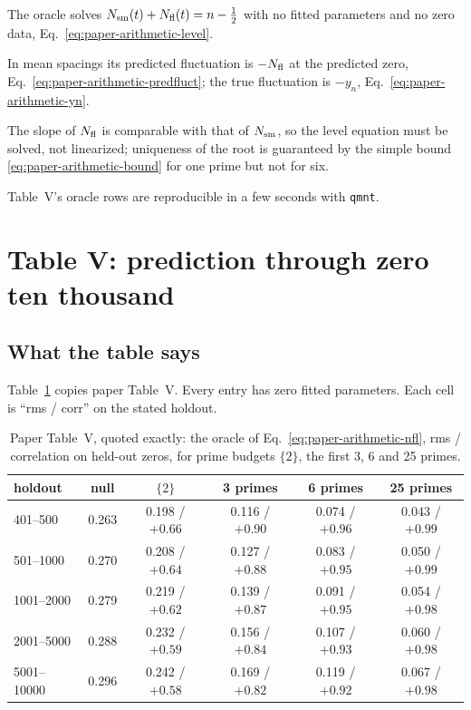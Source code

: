 \begin{keyideas}
\item The oracle solves $N_{\mathrm{sm}}(t)+N_{\mathrm{fl}}(t)=n-\tfrac12$ with no fitted parameters and no zero data, Eq.~\eqref{eq:paper-arithmetic-level}.
\item In mean spacings its predicted fluctuation is $-N_{\mathrm{fl}}$ at the predicted zero, Eq.~\eqref{eq:paper-arithmetic-predfluct}; the true fluctuation is $-y_n$, Eq.~\eqref{eq:paper-arithmetic-yn}.
\item The slope of $N_{\mathrm{fl}}$ is comparable with that of $N_{\mathrm{sm}}$, so the level equation must be solved, not linearized; uniqueness of the root is guaranteed by the simple bound \eqref{eq:paper-arithmetic-bound} for one prime but not for six.
\item Table~V's oracle rows are reproducible in a few seconds with \texttt{qmnt}.
\end{keyideas}

\section{Table V: prediction through zero ten thousand}\label{sec:paper-arithmetic-tablev}

\subsection{What the table says}

Table~\ref{tab:paper-arithmetic-tablev} copies paper Table~V. Every entry has zero fitted parameters. Each cell is ``rms / corr'' on the stated holdout.

\begin{table}[htbp]\centering\small
\caption{Paper Table~V, quoted exactly: the oracle of Eq.~\eqref{eq:paper-arithmetic-nfl}, rms / correlation on held-out zeros, for prime budgets $\{2\}$, the first 3, 6 and 25 primes.}\label{tab:paper-arithmetic-tablev}
\begin{tabular}{lccccc}
\toprule
holdout & null & $\{2\}$ & 3 primes & 6 primes & 25 primes \\
\midrule
401--500 & 0.263 & 0.198 / $+0.66$ & 0.116 / $+0.90$ & 0.074 / $+0.96$ & 0.043 / $+0.99$ \\
501--1000 & 0.270 & 0.208 / $+0.64$ & 0.127 / $+0.88$ & 0.083 / $+0.95$ & 0.050 / $+0.99$ \\
1001--2000 & 0.279 & 0.219 / $+0.62$ & 0.139 / $+0.87$ & 0.091 / $+0.95$ & 0.054 / $+0.98$ \\
2001--5000 & 0.288 & 0.232 / $+0.59$ & 0.156 / $+0.84$ & 0.107 / $+0.93$ & 0.060 / $+0.98$ \\
5001--10000 & 0.296 & 0.242 / $+0.58$ & 0.169 / $+0.82$ & 0.119 / $+0.92$ & 0.067 / $+0.98$ \\
\bottomrule
\end{tabular}
\end{table}

